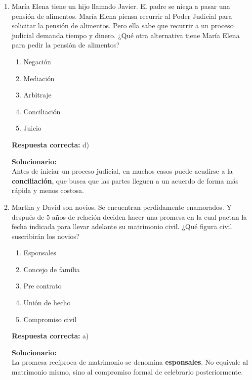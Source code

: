\begin{enumerate}
	
	\item María Elena tiene un hijo llamado Javier. El padre se niega a pasar una pensión de alimentos. María Elena piensa recurrir al Poder Judicial para solicitar la pensión de alimentos. Pero ella sabe que recurrir a un proceso judicial demanda tiempo y dinero. ¿Qué otra alternativa tiene María Elena para pedir la pensión de alimentos?
	\begin{enumerate}[label=\alph*)]
		\item Negación
		\item Mediación
		\item Arbitraje
		\item Conciliación
		\item Juicio
	\end{enumerate}
	\textbf{Respuesta correcta:} d)
	
	\vspace{2mm}
	\textbf{Solucionario:}\\
	Antes de iniciar un proceso judicial, en muchos casos puede acudirse a la \textbf{conciliación}, que busca que las partes lleguen a un acuerdo de forma más rápida y menos costosa.
	
	\vspace{6mm}
	
	\item Martha y David son novios. Se encuentran perdidamente enamorados. Y después de 5 años de relación deciden hacer una promesa en la cual pactan la fecha indicada para llevar adelante su matrimonio civil. ¿Qué figura civil suscribirán los novios?
	\begin{enumerate}[label=\alph*)]
		\item Esponsales
		\item Concejo de familia
		\item Pre contrato
		\item Unión de hecho
		\item Compromiso civil
	\end{enumerate}
	\textbf{Respuesta correcta:} a)
	
	\vspace{2mm}
	\textbf{Solucionario:}\\
	La promesa recíproca de matrimonio se denomina \textbf{esponsales}. No equivale al matrimonio mismo, sino al compromiso formal de celebrarlo posteriormente.
	
	\vspace{6mm}
	

\end{enumerate}
